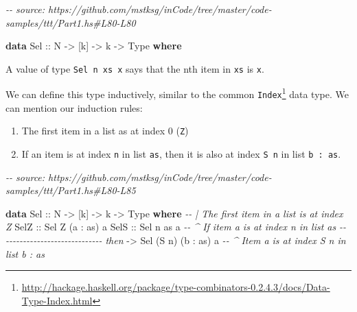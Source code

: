 \documentclass[]{article}
\newenvironment{Shaded}{}{}
\newcommand{\CommentTok}[1]{\textcolor[rgb]{0.38,0.63,0.69}{\textit{#1}}}
\newcommand{\DataTypeTok}[1]{\textcolor[rgb]{0.56,0.13,0.00}{#1}}
\newcommand{\KeywordTok}[1]{\textcolor[rgb]{0.00,0.44,0.13}{\textbf{#1}}}
\newcommand{\NormalTok}[1]{#1}
\newcommand{\OperatorTok}[1]{\textcolor[rgb]{0.40,0.40,0.40}{#1}}
\newcommand{\OtherTok}[1]{\textcolor[rgb]{0.00,0.44,0.13}{#1}}
\renewcommand{\href}[2]{#2\footnote{\url{#1}}}
\begin{document}
\begin{Shaded}
\begin{Highlighting}[]
\CommentTok{{-}{-} source: https://github.com/mstksg/inCode/tree/master/code{-}samples/ttt/Part1.hs\#L80{-}L80}

\KeywordTok{data} \DataTypeTok{Sel}\OtherTok{ ::} \DataTypeTok{N} \OtherTok{{-}\textgreater{}}\NormalTok{ [k] }\OtherTok{{-}\textgreater{}}\NormalTok{ k }\OtherTok{{-}\textgreater{}} \DataTypeTok{Type} \KeywordTok{where}
\end{Highlighting}
\end{Shaded}

A value of type \texttt{Sel\ n\ xs\ x} says that the nth item in \texttt{xs} is
\texttt{x}.

We can define this type inductively, similar to the common
\href{http://hackage.haskell.org/package/type-combinators-0.2.4.3/docs/Data-Type-Index.html}{\texttt{Index}}
data type. We can mention our induction rules:

\begin{enumerate}
\def\labelenumi{\arabic{enumi}.}
\tightlist
\item
  The first item in a list as at index 0 (\texttt{Z})
\item
  If an item is at index \texttt{n} in list \texttt{as}, then it is also at
  index \texttt{S\ n} in list \texttt{b\ \textquotesingle{}:\ as}.
\end{enumerate}

\begin{Shaded}
\begin{Highlighting}[]
\CommentTok{{-}{-} source: https://github.com/mstksg/inCode/tree/master/code{-}samples/ttt/Part1.hs\#L80{-}L85}

\KeywordTok{data} \DataTypeTok{Sel}\OtherTok{ ::} \DataTypeTok{N} \OtherTok{{-}\textgreater{}}\NormalTok{ [k] }\OtherTok{{-}\textgreater{}}\NormalTok{ k }\OtherTok{{-}\textgreater{}} \DataTypeTok{Type} \KeywordTok{where}
    \CommentTok{{-}{-} | The first item in a list is at index \textquotesingle{}\textquotesingle{}Z\textquotesingle{}}
    \DataTypeTok{SelZ}\OtherTok{ ::} \DataTypeTok{Sel} \DataTypeTok{\textquotesingle{}Z}\NormalTok{ (a \textquotesingle{}}\OperatorTok{:}\NormalTok{ as) a}
    \DataTypeTok{SelS}\OtherTok{ ::} \DataTypeTok{Sel}\NormalTok{     n        as  a  }\CommentTok{{-}{-} \^{} If item \textasciigrave{}a\textasciigrave{} is at index \textasciigrave{}n\textasciigrave{} in list \textasciigrave{}as\textasciigrave{}}
         \CommentTok{{-}{-} {-}{-}{-}{-}{-}{-}{-}{-}{-}{-}{-}{-}{-}{-}{-}{-}{-}{-}{-}{-}{-}{-}{-}{-}{-}{-}{-}{-} then}
         \OtherTok{{-}\textgreater{}} \DataTypeTok{Sel}\NormalTok{ (}\DataTypeTok{\textquotesingle{}S}\NormalTok{ n) (b \textquotesingle{}}\OperatorTok{:}\NormalTok{ as) a  }\CommentTok{{-}{-} \^{} Item \textasciigrave{}a\textasciigrave{} is at index \textasciigrave{}S n\textasciigrave{} in list \textasciigrave{}b : as\textasciigrave{}}
\end{Highlighting}
\end{Shaded}
\end{document}
